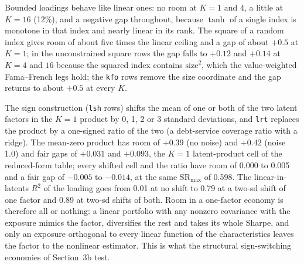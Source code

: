 \documentclass[11pt]{article}
\begin{document}
\noindent Bounded loadings behave like linear ones: no room at $K=1$ and $4$, a little at $K=16$ (12\%), and a negative gap throughout, because $\tanh$ of a single index is monotone in that index and nearly linear in its rank. The square of a random index gives room of about five times the linear ceiling and a gap of about $+0.5$ at $K=1$; in the unconstrained square rows the gap falls to $+0.12$ and $+0.14$ at $K=4$ and $16$ because the squared index contains $\mathrm{size}^2$, which the value-weighted Fama--French legs hold; the \texttt{kfo} rows remove the size coordinate and the gap returns to about $+0.5$ at every $K$.

\noindent The sign construction (\texttt{lsh} rows) shifts the mean of one or both of the two latent factors in the $K=1$ product by 0, 1, 2 or 3 standard deviations, and \texttt{lrt} replaces the product by a one-signed ratio of the two (a debt-service coverage ratio with a ridge). The mean-zero product has room of $+0.39$ (no noise) and $+0.42$ (noise 1.0) and fair gaps of $+0.031$ and $+0.093$, the $K=1$ latent-product cell of the reduced-form table; every shifted cell and the ratio have room of 0.000 to 0.005 and a fair gap of $-0.005$ to $-0.014$, at the same $\mathrm{SR}_{\max}$ of 0.598. The linear-in-latents $R^2$ of the loading goes from 0.01 at no shift to 0.79 at a two-sd shift of one factor and 0.89 at two-sd shifts of both. Room in a one-factor economy is therefore all or nothing: a linear portfolio with any nonzero covariance with the exposure mimics the factor, diversifies the rest and takes its whole Sharpe, and only an exposure orthogonal to every linear function of the characteristics leaves the factor to the nonlinear estimator. This is what the structural sign-switching economies of Section~3b test.
\end{document}

